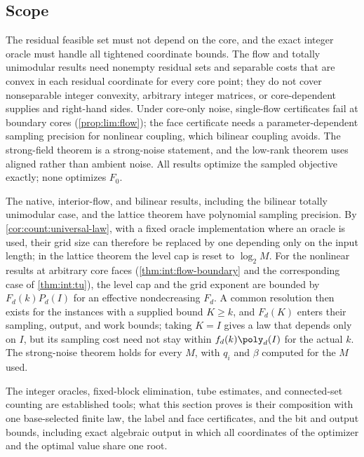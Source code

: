 \subsection{Scope}\label{sec:int:scope}

The residual feasible set must not depend on the core, and the exact integer
oracle must handle all tightened coordinate bounds. The flow and totally
unimodular results need nonempty residual sets and separable costs that are
convex in each residual coordinate for every core point; they do not cover
nonseparable integer convexity, arbitrary integer matrices, or core-dependent
supplies and right-hand sides. Under core-only noise, single-flow certificates
fail at boundary cores (\cref{prop:lim:flow}); the face certificate needs a
parameter-dependent sampling precision for nonlinear coupling, which bilinear
coupling avoids. The strong-field theorem is a strong-noise statement, and the
low-rank theorem uses aligned rather than ambient noise. All results optimize
the sampled objective exactly; none optimizes $F_0$.

The native, interior-flow, and bilinear results, including the bilinear
totally unimodular case, and the lattice theorem have polynomial sampling
precision. By \cref{cor:count:universal-law}, with a fixed oracle
implementation where an oracle is used, their grid size can therefore be
replaced by one depending only on the input length; in the lattice theorem
the level cap is reset to $\log_2M$. For the nonlinear results at arbitrary
core faces (\cref{thm:int:flow-boundary} and the corresponding case of
\cref{thm:int:tu}), the level cap and the grid exponent are bounded by
$F_d(k)P_d(I)$ for an effective nondecreasing $F_d$. A common resolution then
exists for the instances with a supplied bound $K\ge k$, and $F_d(K)$ enters
their sampling, output, and work bounds; taking $K=I$ gives a law that
depends only on $I$, but its sampling cost need not stay within
$f_d(k)\poly_d(I)$ for the actual $k$. The strong-noise theorem holds for
every $M$, with $q_i$ and $\beta$ computed for the $M$ used.

The integer oracles, fixed-block elimination, tube estimates, and
connected-set counting are established tools; what this section proves is
their composition with one base-selected finite law, the label and face
certificates, and the bit and output bounds, including exact algebraic output
in which all coordinates of the optimizer and the optimal value share one
root.
